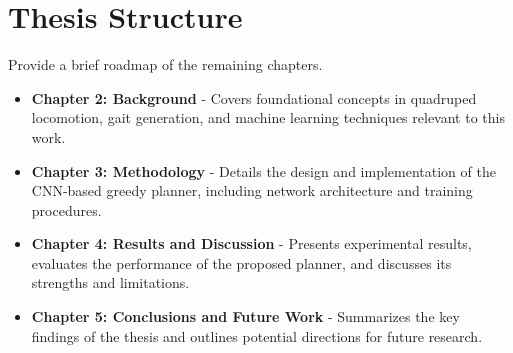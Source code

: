 \section{Thesis Structure}

\begin{outline}
  Provide a brief roadmap of the remaining chapters.
\end{outline}

\begin{itemize}
  \item \textbf{Chapter 2: Background} - Covers foundational concepts
    in quadruped locomotion, gait generation, and machine learning
    techniques relevant to this work.
  \item \textbf{Chapter 3: Methodology} - Details the design and
    implementation of the CNN-based greedy planner, including network
    architecture and training procedures.
  \item \textbf{Chapter 4: Results and Discussion} - Presents
    experimental results, evaluates the performance of the proposed
    planner, and discusses its strengths and limitations.
  \item \textbf{Chapter 5: Conclusions and Future Work} - Summarizes
    the key findings of the thesis and outlines potential directions
    for future research.
\end{itemize}
